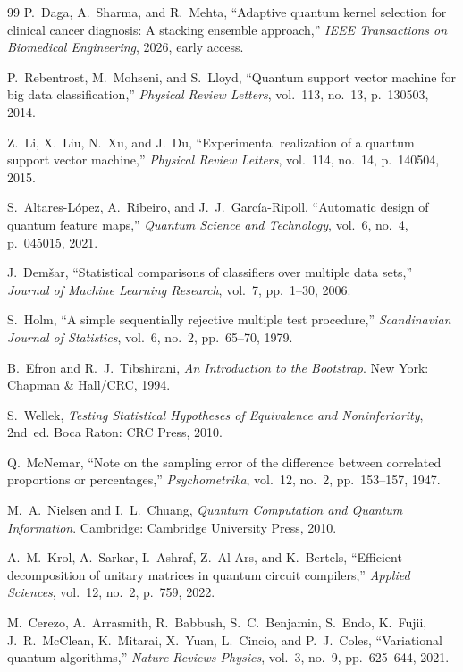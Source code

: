 \documentclass[journal,twocolumn]{IEEEtran}
\begin{document}
\begin{thebibliography}{99}
P.~Daga, A.~Sharma, and R.~Mehta,
``Adaptive quantum kernel selection for clinical cancer diagnosis: A stacking ensemble approach,''
\emph{IEEE Transactions on Biomedical Engineering}, 2026, early access.

P.~Rebentrost, M.~Mohseni, and S.~Lloyd,
``Quantum support vector machine for big data classification,''
\emph{Physical Review Letters}, vol.~113, no.~13, p.~130503, 2014.

Z.~Li, X.~Liu, N.~Xu, and J.~Du,
``Experimental realization of a quantum support vector machine,''
\emph{Physical Review Letters}, vol.~114, no.~14, p.~140504, 2015.

S.~Altares-L{\'o}pez, A.~Ribeiro, and J.~J.~Garc{\'i}a-Ripoll,
``Automatic design of quantum feature maps,''
\emph{Quantum Science and Technology}, vol.~6, no.~4, p.~045015, 2021.

J.~Dem{\v s}ar,
``Statistical comparisons of classifiers over multiple data sets,''
\emph{Journal of Machine Learning Research}, vol.~7, pp.~1--30, 2006.

S.~Holm,
``A simple sequentially rejective multiple test procedure,''
\emph{Scandinavian Journal of Statistics}, vol.~6, no.~2, pp.~65--70, 1979.

B.~Efron and R.~J.~Tibshirani,
\emph{An Introduction to the Bootstrap}.
New York: Chapman \& Hall/CRC, 1994.

S.~Wellek,
\emph{Testing Statistical Hypotheses of Equivalence and Noninferiority}, 2nd~ed.
Boca Raton: CRC Press, 2010.

Q.~McNemar,
``Note on the sampling error of the difference between correlated proportions or percentages,''
\emph{Psychometrika}, vol.~12, no.~2, pp.~153--157, 1947.

M.~A.~Nielsen and I.~L.~Chuang,
\emph{Quantum Computation and Quantum Information}.
Cambridge: Cambridge University Press, 2010.

A.~M.~Krol, A.~Sarkar, I.~Ashraf, Z.~Al-Ars, and K.~Bertels,
``Efficient decomposition of unitary matrices in quantum circuit compilers,''
\emph{Applied Sciences}, vol.~12, no.~2, p.~759, 2022.

M.~Cerezo, A.~Arrasmith, R.~Babbush, S.~C.~Benjamin, S.~Endo, K.~Fujii, J.~R.~McClean, K.~Mitarai, X.~Yuan, L.~Cincio, and P.~J.~Coles,
``Variational quantum algorithms,''
\emph{Nature Reviews Physics}, vol.~3, no.~9, pp.~625--644, 2021.


\end{thebibliography}
\end{document}
